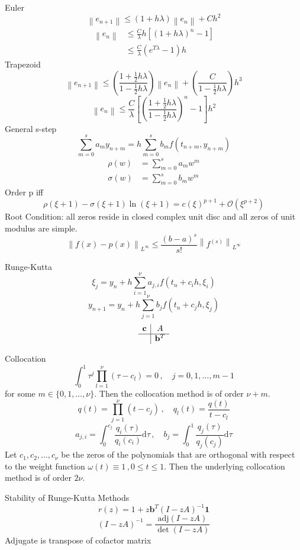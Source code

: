 \documentclass[letterpaper]{article}
\providecommand{\norm}[1]{\left\lVert#1\right\rVert}
\def\d{\mathrm{d}}
\begin{document}
\begin{multicols}{2}
\scriptsize
\setlength{}
\setlength{}
Euler
\[
\norm{e_{n+1}}\le(1+h\lambda)\norm{e_n}+Ch^2
\]
\begin{align*}
\norm{e_n}&\le\frac{C}{\lambda}h\left[(1+h\lambda)^n-1\right]\\
&\le\frac{C}{\lambda}(e^{T\lambda}-1)h
\end{align*}
Trapezoid
\[
\norm{e_{n+1}}\le\left(\frac{1+\frac{1}{2}h\lambda}{1-\frac{1}{2}h\lambda}\right)\norm{e_n}+\left(\frac{C}{1-\frac{1}{2}h\lambda}\right)h^3
\]
\[
\norm{e_n}\leq\frac{C}{\lambda}\left[\left(\frac{1+\frac{1}{2}h\lambda}{1-\frac{1}{2}h\lambda}\right)^n-1\right]h^2
\]
General s-step
\[
\sum_{m=0}^sa_my_{n+m}=h\sum_{m=0}^sb_mf(t_{n+m},y_{n+m})
\]
\begin{align*}
\rho(w)&=\sum_{m=0}^sa_mw^m\\
\sigma(w)&=\sum_{m=0}^sb_mw^m
\end{align*}
Order p iff
\[
\rho(\xi+1)-\sigma(\xi+1)\ln(\xi+1)=c(\xi)^{p+1}+\mathcal{O}(\xi^{p+2})
\]
Root Condition: all zeros reside in closed complex unit disc and all zeros of
unit modulus are simple.
\[
\norm{f(x)-p(x)}_{L^\infty}\le\frac{(b-a)^s}{s!}\norm{f^{(s)}}_{L^\infty}
\]

Runge-Kutta
\[
\xi_j=y_n+h\sum_{i=1}^\nu a_{j,i}f(t_n+c_ih,\xi_i)
\]
\[
y_{n+1}=y_n+h\sum_{j=1}^\nu b_jf(t_n+c_jh,\xi_j)
\]
\[
\begin{array}{c|c}
\mathbf{c} & A\\
\hline
& \mathbf{b}^T
\end{array}
\]

Collocation
\[
\int_0^1\tau^j\prod_{l=1}^\nu(\tau-c_l)=0\,,\quad j=0,1,\dots,m-1
\]
for some $m\in\{0,1,\dots,\nu\}$. Then the collocation method is of order
$\nu+m$.
\[
q(t)=\prod_{j=1}^\nu(t-c_j)\,,\quad q_l(t)=\frac{q(t)}{t-c_l}
\]
\[
a_{j,i}=\int_0^{c_j}\frac{q_i(\tau)}{q_i(c_i)}\d\tau\,,\quad    
b_j=\int_0^1\frac{q_j(\tau)}{q_j(c_j)}\d\tau
\]
Let $c_1,c_2,\dots,c_\nu$ be the zeros of the polynomials that are orthogonal
with respect to the weight function $\omega(t)\equiv 1\,,0\le t\le1$. Then the
underlying collocation method is of order $2\nu$.

Stability of Runge-Kutta Methods
\[
r(z)=1+z\mathbf{b}^T(I-zA)^{-1}\mathbf{1}
\]
\[
(I-zA)^{-1}=\frac{\mathrm{adj}(I-zA)}{\det(I-zA)}
\]
Adjugate is transpose of cofactor matrix


\end{multicols}
\end{document}
